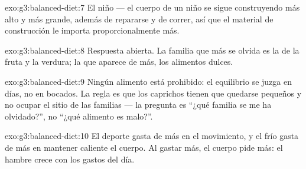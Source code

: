 \begin{solution}{exo:g3:balanced-diet:7}
El niño --- el cuerpo de un niño se sigue construyendo más alto y más
grande, además de repararse y de correr, así que el material de
construcción le importa proporcionalmente más.
\end{solution}

\begin{solution}{exo:g3:balanced-diet:8}
Respuesta abierta. La familia que más se olvida es la de la fruta y la
verdura; la que aparece de más, los alimentos dulces.
\end{solution}

\begin{solution}{exo:g3:balanced-diet:9}
Ningún alimento está prohibido: el equilibrio se juzga en días, no en
bocados. La regla es que los caprichos tienen que quedarse pequeños y
no ocupar el sitio de las familias --- la pregunta es ``¿qué familia
se me ha olvidado?'', no ``¿qué alimento es malo?''.
\end{solution}

\begin{solution}{exo:g3:balanced-diet:10}
El deporte gasta  de más en el movimiento, y el frío gasta
 de más en mantener caliente el cuerpo. Al gastar más, el
cuerpo pide más: el hambre crece con los gastos del día.
\end{solution}
